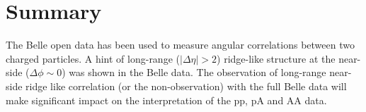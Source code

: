 \section{Summary}

The Belle open data has been used to measure angular correlations between
two charged particles. A hint of long-range ($|\Delta\eta|>2$) ridge-like structure at the
near-side ($\Delta\phi\sim 0$) was shown in the Belle data. The observation of
long-range near-side ridge like correlation (or the non-observation) with the full Belle data will make significant impact on the interpretation of the pp, pA and AA data.

